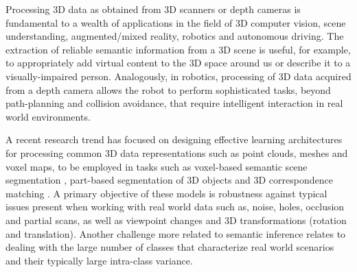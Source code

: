 \documentclass[runningheads]{llncs}
\begin{document}
Processing 3D data as obtained from 3D scanners or depth cameras is fundamental to a wealth of applications in the field of 3D computer vision, scene understanding, augmented/mixed reality, robotics and autonomous driving. 
The extraction of reliable semantic information from a 3D scene is useful, for example, to appropriately add virtual content to the 3D space around us or describe it to a visually-impaired person. %
Analogously, in robotics, processing of 3D data acquired from a depth camera allows the robot to perform sophisticated tasks, beyond path-planning and collision avoidance, that require intelligent interaction in real world environments.

A recent research trend has focused on designing effective learning architectures for processing common 3D data representations such as point clouds, meshes and voxel maps, to be employed in tasks such as voxel-based semantic scene segmentation \cite{Dai2017}, part-based segmentation of 3D objects \cite{Qi2017} and 3D correspondence matching \cite{Zeng2016}. A primary objective of these models is robustness against typical issues present when working with real world data such as, noise, holes, occlusion and partial scans, as well as viewpoint changes and 3D transformations (rotation and translation). Another challenge more related to semantic inference relates to dealing with the large number of classes that characterize real world scenarios and their typically large intra-class variance. 
\end{document}
